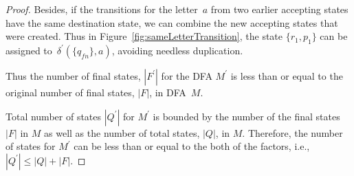 \documentclass{lmcs} %
\theoremstyle{plain}\newtheorem{satz}[thm]{Satz} %
\newcommand{\ignore}[1]{}
\begin{document}
\begin{appendices}
\begin{proof}
\ignore{
However, if the letter we want to concatenate does not have a
transition from the final states of $M$, the state of the string, $p_1
\ldots p_n$ will be the new final states of the DFA $M_{}^{\prime}$.
}

Besides, if the transitions for the letter~$a$ from
two earlier accepting states have the same destination state,
we can combine the new accepting states that were created.
Thus in
Figure~\ref{fig:sameLetterTransition}, the state
$\{ r_1, p_1 \}$ can be assigned to~$\delta^{\prime} (\{q_{fn}\}, a)$,
avoiding needless duplication.

Thus the number of final states, $|F_{}^{\prime}|$
for the DFA $M_{}^{\prime}$ is less than or equal to the original
number of final states, $|F|$, in DFA~$M$.

Total number of states $|Q_{}^{\prime}|$ for $M_{}^{\prime}$ is
bounded by the number of the final states $|F|$ in $M$ as well as the
number of total states, $|Q|$, in $M$.  Therefore, the
number of states for $M_{}^{\prime}$ can be less than or equal to the
both of the factors, i.e., $|Q_{}^{\prime}| \leq |Q|+|F|$.
\end{proof}


\begin{figure}%
\centering
{}
\end{figure}
\end{appendices}
\end{document}
